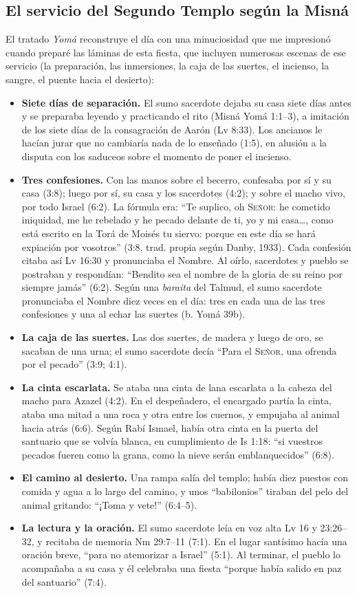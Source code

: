 \documentclass[11pt,letterpaper]{article}
\newcommand{\SENOR}{\textsc{Señor}}
\begin{document}
\subsection{El servicio del Segundo Templo según la Misná}
El tratado \emph{Yomá} reconstruye el día con una minuciosidad que me impresionó cuando preparé las láminas de esta fiesta, que incluyen numerosas escenas de ese servicio (la preparación, las inmersiones, la caja de las suertes, el incienso, la sangre, el puente hacia el desierto):
\begin{itemize}\setlength{\itemsep}{2pt}
\item \textbf{Siete días de separación.} El sumo sacerdote dejaba su casa siete días antes y se preparaba leyendo y practicando el rito (Misná Yomá 1:1--3), a imitación de los siete días de la consagración de Aarón (Lv 8:33). Los ancianos le hacían jurar que no cambiaría nada de lo enseñado (1:5), en alusión a la disputa con los saduceos sobre el momento de poner el incienso.
\item \textbf{Tres confesiones.} Con las manos sobre el becerro, confesaba por sí y su casa (3:8); luego por sí, su casa y los sacerdotes (4:2); y sobre el macho vivo, por todo Israel (6:2). La fórmula era: ``Te suplico, oh \SENOR: he cometido iniquidad, me he rebelado y he pecado delante de ti, yo y mi casa\ldots{}, como está escrito en la Torá de Moisés tu siervo: porque en este día se hará expiación por vosotros'' (3:8, trad. propia según Danby, 1933). Cada confesión citaba así Lv 16:30 y pronunciaba el Nombre. Al oírlo, sacerdotes y pueblo se postraban y respondían: ``Bendito sea el nombre de la gloria de su reino por siempre jamás'' (6:2). Según una \emph{baraita} del Talmud, el sumo sacerdote pronunciaba el Nombre diez veces en el día: tres en cada una de las tres confesiones y una al echar las suertes (b. Yomá 39b).
\item \textbf{La caja de las suertes.} Las dos suertes, de madera y luego de oro, se sacaban de una urna; el sumo sacerdote decía ``Para el \SENOR, una ofrenda por el pecado'' (3:9; 4:1).
\item \textbf{La cinta escarlata.} Se ataba una cinta de lana escarlata a la cabeza del macho para Azazel (4:2). En el despeñadero, el encargado partía la cinta, ataba una mitad a una roca y otra entre los cuernos, y empujaba al animal hacia atrás (6:6). Según Rabí Ismael, había otra cinta en la puerta del santuario que se volvía blanca, en cumplimiento de Is 1:18: ``si vuestros pecados fueren como la grana, como la nieve serán emblanquecidos'' (6:8).
\item \textbf{El camino al desierto.} Una rampa salía del templo; había diez puestos con comida y agua a lo largo del camino, y unos ``babilonios'' tiraban del pelo del animal gritando: ``¡Toma y vete!'' (6:4--5).
\item \textbf{La lectura y la oración.} El sumo sacerdote leía en voz alta Lv 16 y 23:26--32, y recitaba de memoria Nm 29:7--11 (7:1). En el lugar santísimo hacía una oración breve, ``para no atemorizar a Israel'' (5:1). Al terminar, el pueblo lo acompañaba a su casa y él celebraba una fiesta ``porque había salido en paz del santuario'' (7:4).
\end{itemize}
\end{document}
